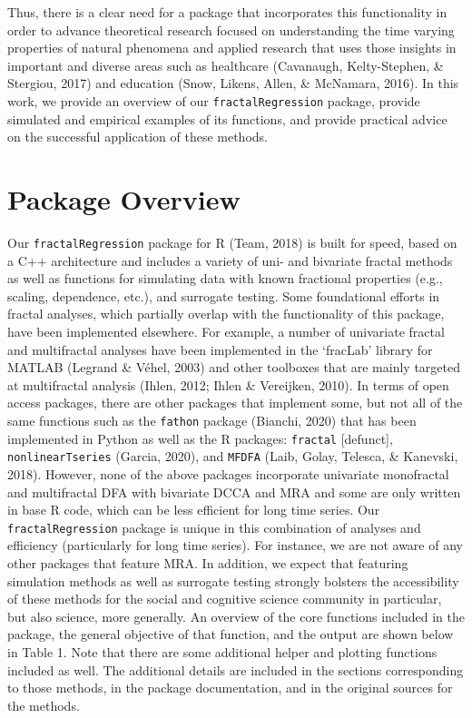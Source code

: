 \documentclass[
  man]{apa6}
\begin{document}
Thus, there is a clear need for a package that incorporates this
functionality in order to advance theoretical research focused on
understanding the time varying properties of natural phenomena and
applied research that uses those insights in important and diverse areas
such as healthcare (Cavanaugh, Kelty-Stephen, \& Stergiou, 2017) and education (Snow, Likens, Allen, \& McNamara, 2016). In this
work, we provide an overview of our \texttt{fractalRegression} package, provide
simulated and empirical examples of its functions, and provide practical
advice on the successful application of these methods.

\hypertarget{package-overview}{%
\section{Package Overview}\label{package-overview}}

Our \texttt{fractalRegression} package for R
(Team, 2018) is built for speed, based
on a C++ architecture and includes a variety of uni- and bivariate
fractal methods as well as functions for simulating data with known
fractional properties (e.g., scaling, dependence, etc.), and surrogate
testing. Some foundational efforts in fractal analyses, which partially
overlap with the functionality of this package, have been implemented
elsewhere. For example, a number of univariate fractal and multifractal
analyses have been implemented in the `fracLab' library for MATLAB
(Legrand \& Véhel, 2003) and other toolboxes that are mainly targeted at
multifractal analysis (Ihlen, 2012; Ihlen \& Vereijken, 2010). In terms of open access
packages, there are other packages that implement some, but not all of
the same functions such as the \texttt{fathon} package (Bianchi, 2020) that has
been implemented in Python as well as the R packages: \texttt{fractal}
{[}defunct{]}, \texttt{nonlinearTseries}
(Garcia, 2020), and \texttt{MFDFA}
(Laib, Golay, Telesca, \& Kanevski, 2018). However, none of the above packages
incorporate univariate monofractal and multifractal DFA with bivariate
DCCA and MRA and some are only written in base R code, which can be less
efficient for long time series. Our \texttt{fractalRegression} package is
unique in this combination of analyses and efficiency (particularly for
long time series). For instance, we are not aware of any other packages
that feature MRA. In addition, we expect that featuring simulation
methods as well as surrogate testing strongly bolsters the accessibility
of these methods for the social and cognitive science community in
particular, but also science, more generally. An overview of the core
functions included in the package, the general objective of that
function, and the output are shown below in Table 1. Note that there are
some additional helper and plotting functions included as well. The
additional details are included in the sections corresponding to those
methods, in the package documentation, and in the original sources for
the methods.
\end{document}
